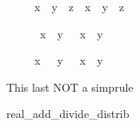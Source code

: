 \begin{isabellebody}
\begin{isamarkuptext}
\begin{isabelle}%
\ \ \ \ \ x\ {\isacharslash}\ y\ {\isacharslash}\ z\ {\isacharequal}\ x\ {\isacharslash}\ {\isacharparenleft}y\ {\isacharasterisk}\ z{\isacharparenright}%
\end{isabelle}

\begin{isabelle}%
\ \ \ \ \ {\isacharminus}\ x\ {\isacharslash}\ y\ {\isacharequal}\ {\isacharminus}\ {\isacharparenleft}x\ {\isacharslash}\ y{\isacharparenright}%
\end{isabelle}

\begin{isabelle}%
\ \ \ \ \ x\ {\isacharslash}\ {\isacharminus}\ y\ {\isacharequal}\ {\isacharminus}\ {\isacharparenleft}x\ {\isacharslash}\ y{\isacharparenright}%
\end{isabelle}

This last NOT a simprule

real_add_divide_distrib%
\end{isamarkuptext}%
\isanewline
\end{isabellebody}%
